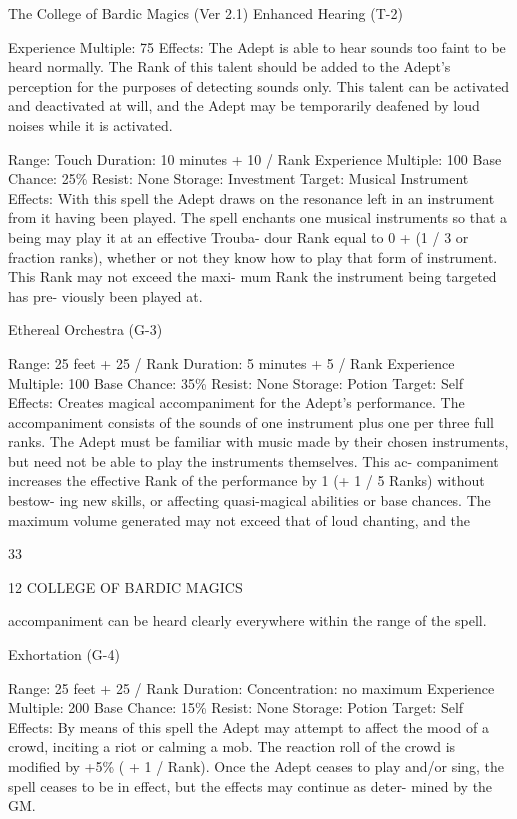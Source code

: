 \begin{Chapter}{The College of Bardic Magics (Ver 2.1)}
Enhanced Hearing (T-2) 

Experience Multiple: 75 
Effects: The Adept is able to hear sounds too faint 
to  be  heard  normally.  The  Rank  of  this  talent 
should  be  added  to  the  Adept’s  perception  for  the 
purposes  of  detecting  sounds  only.  This talent  can 
be activated and deactivated at will, and the Adept 
may be temporarily deafened by loud noises while 
it is activated. 

Range: Touch 
Duration: 10 minutes + 10 / Rank 
Experience Multiple: 100 
Base Chance: 25\% 
Resist: None 
Storage: Investment 
Target: Musical Instrument 
Effects:  With  this  spell  the  Adept  draws  on  the 
resonance left in an instrument from it having been 
played. The spell enchants one musical instruments 
so that a being may play it at an effective Trouba-
dour  Rank  equal  to  0  +  (1  /  3  or  fraction  ranks), 
whether or not they know how to play that form of 
instrument.  This  Rank  may  not  exceed  the  maxi-
mum  Rank  the  instrument  being  targeted  has  pre-
viously been played at. 

Ethereal Orchestra (G-3) 

Range: 25 feet + 25 / Rank 
Duration: 5 minutes + 5 / Rank 
Experience Multiple: 100 
Base Chance: 35\% 
Resist: None 
Storage: Potion 
Target: Self 
Effects:  Creates  magical  accompaniment  for  the 
Adept’s performance. The accompaniment consists 
of the sounds of one instrument plus one per three 
full ranks. The Adept must be familiar with music 
made by their chosen instruments, but need not be 
able  to  play  the  instruments  themselves.  This  ac-
companiment  increases  the  effective  Rank  of  the 
performance by 1 (+ 1 / 5 Ranks) without bestow-
ing  new  skills,  or  affecting  quasi-magical  abilities 
or  base  chances.  The  maximum  volume  generated 
may  not  exceed  that  of  loud  chanting,  and  the 

33 

12 COLLEGE OF BARDIC MAGICS 

accompaniment  can  be  heard  clearly  everywhere 
within the range of the spell. 

Exhortation (G-4) 

Range: 25 feet + 25 / Rank 
Duration: Concentration: no maximum 
Experience Multiple: 200 
Base Chance: 15\% 
Resist: None 
Storage: Potion 
Target: Self 
Effects:  By  means  of  this  spell  the  Adept  may 
attempt  to  affect  the  mood  of  a  crowd,  inciting  a 
riot  or  calming  a  mob.  The  reaction  roll  of  the 
crowd is modified by +5\% ( + 1 / Rank). Once the 
Adept ceases to play and/or sing, the spell ceases to 
be in effect, but the effects may continue as deter-
mined by the GM. 


\end{Chapter}
